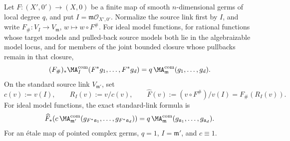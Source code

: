 \begin{proposition}\label{prop:frontier-local-ma-finite-map}
Let \(F:(X',0')\to(X,0)\) be a finite map of smooth
\(n\)-dimensional germs of local degree \(q\), and put
\(I=\mathfrak m\mathcal O_{X',0'}\).  Normalize the source link first by
\(I\), and write
\(F_\#:V_I\to V_{\mathfrak m}\), \(w\mapsto w\circ F^\#\).  For ideal
model functions, for rational functions whose target models and pulled-back
source models both lie in the algebraizable model locus, and for members of the joint bounded
closure whose pullbacks remain in that closure,
\begin{equation}
 (F_\#)_*\MA^{\mathrm{com}}_I(F^*g_1,\ldots,F^*g_d)
 =q\,\MA^{\mathrm{com}}_{\mathfrak m}(g_1,\ldots,g_d).
 \label{eq:frontier-local-ma-finite-projection}
\end{equation}
On the standard source link \(V_{\mathfrak m'}\), set
\[
 c(v):=v(I),\qquad R_I(v):=v/c(v),\qquad
 \widehat F(v):=(v\circ F^\#)/v(I)=F_\#(R_I(v)).
\]
For ideal model functions, the exact standard-link formula is
\begin{equation}
 \widehat F_*\!\left(
 c\,\MA^{\mathrm{com}}_{\mathfrak m'}
   (g_{F^*\mathfrak a_1},\ldots,g_{F^*\mathfrak a_d})\right)
 =q\,\MA^{\mathrm{com}}_{\mathfrak m}
   (g_{\mathfrak a_1},\ldots,g_{\mathfrak a_d}).
 \label{eq:frontier-local-ma-standard-link}
\end{equation}
For an \'etale map of pointed complex germs, \(q=1\),
\(I=\mathfrak m'\), and \(c\equiv1\).
\end{proposition}

